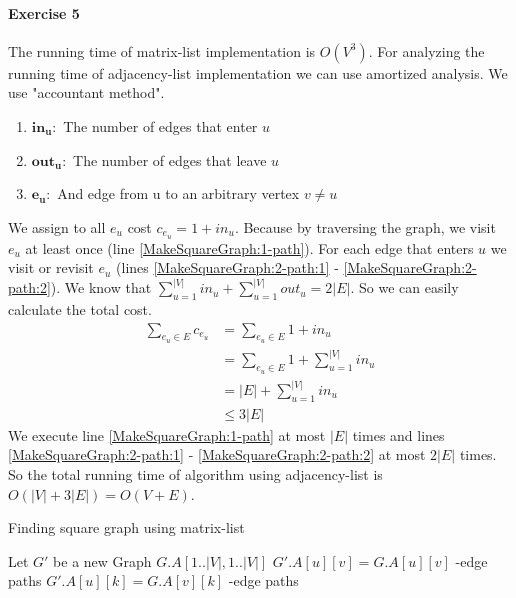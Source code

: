 \documentclass{book}
\begin{document}
	\paragraph{Exercise 5}
	The running time of matrix-list implementation is $O(V^3)$. For analyzing the running time of adjacency-list implementation we can use amortized analysis. We use "accountant method".
	\begin{enumerate}
		\item[] $\boldsymbol{in_u:}$ The number of edges that enter $u$
		\item[] $\boldsymbol{out_u:}$ The number of edges that leave $u$
		\item[] $\boldsymbol{e_u:}$ And edge from u to an arbitrary vertex $v \ne u$
	\end{enumerate}
	We assign to all $e_u$ cost $c_{e_u} = 1 + in_u$. Because by traversing the graph, we visit $e_u$ at least once (line \ref{MakeSquareGraph:1-path}). For each edge that enters $u$ we visit or revisit $e_u$ (lines \ref{MakeSquareGraph:2-path:1} - \ref{MakeSquareGraph:2-path:2}). We know that $\sum_{u = 1}^{|V|}{in_u} + \sum_{u = 1}^{|V|}{out_u} = 2|E|$. So we can easily calculate the total cost.
	\begin{equation*}
		\begin{split}
		\sum_{e_u \in E}{c_{e_u}} &= \sum_{e_u \in E}{1 + in_u} \\
		&= \sum_{e_u \in E}{1} + \sum_{u = 1}^{|V|}{in_u} \\
		&= |E| + \sum_{u = 1}^{|V|}{in_u} \\
		&\le 3|E|
		\end{split}
	\end{equation*}
	We execute line \ref{MakeSquareGraph:1-path} at most $|E|$ times and lines \ref{MakeSquareGraph:2-path:1} - \ref{MakeSquareGraph:2-path:2} at most $2|E|$ times. So the total running time of algorithm using adjacency-list is $O(|V| + 3|E|) = O(V + E)$.
	\begin{algorithm*}[h!]
		\caption{Finding square graph using matrix-list}
		\begin{algorithmic}[1]
				\State Let $G'$ be a new Graph
				\Comment $G.A[1..|V|, 1..|V|]$
						\State $G'.A[u][v] = G.A[u][v]$
						-edge paths
								\State $G'.A[u][k] = G.A[v][k]$
								-edge paths
							\EndFor
						\EndIf
					\EndFor
				\EndFor				
			\EndFunction
		\end{algorithmic}
	\end{algorithm*}
\end{document}
